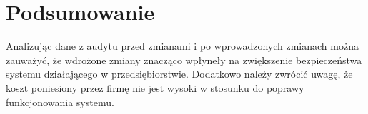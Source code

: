 \newpage
\section{Podsumowanie}
Analizując dane z audytu przed zmianami i po wprowadzonych zmianach można zauważyć, że wdrożone zmiany znacząco wpłyneły na zwiększenie bezpieczeństwa systemu działającego w przedsiębiorstwie. Dodatkowo należy zwrócić uwagę, że koszt poniesiony przez firmę nie jest wysoki w stosunku do poprawy funkcjonowania systemu.